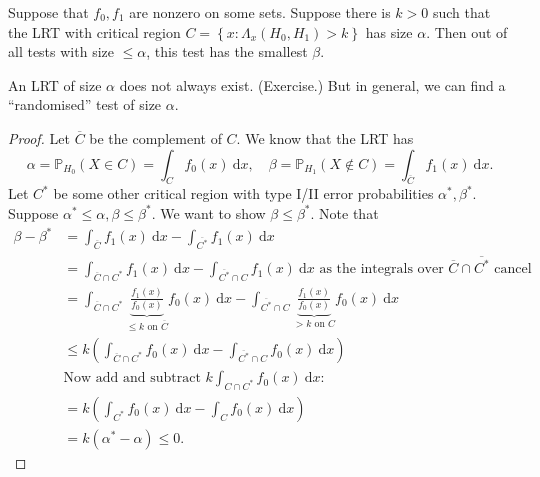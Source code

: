 \documentclass[egregdoesnotlikesansseriftitles,a4paper]{scrartcl}
\begin{document}
\begin{lemma}\label{neymanpearson}
      Suppose that $f_0 ,f_1 $ are nonzero on some sets. Suppose there is $k >0$ such that the LRT with critical region $C= \left\{x: \Lambda_{x} (H_0 ,H_1 ) >k\right\}$ has size $\alpha $. Then out of all tests with size $\leq  \alpha $, this test has the smallest $\beta $. 
      \begin{remark}
            An LRT of size $\alpha $ does not always exist. (Exercise.) But in general, we can find a ``randomised'' test of size $\alpha $.
      \end{remark}
      \begin{proof}
          Let $\overline{C}$ be the complement of $C$. We know that the LRT has \[
          \alpha =\mathbb{P}_{H_0 } (X \in C) =\int_{C}^{}f_{0} (x) \ \mathrm{d} x, \quad \beta  =\mathbb{P}_{H_1 } (X \notin C) =\int_{\overline{C}}^{}f_{1} (x) \ \mathrm{d} x
          .\] Let $C^{*}$ be some other critical region with type I/II error probabilities $\alpha ^* ,\beta ^* $. Suppose $\alpha ^* \leq \alpha , \beta  \leq \beta ^*$. We want to show $\beta  \leq \beta ^*$. Note that
          \begin{align*}
              \beta -\beta ^* &= \int_{\overline{C}}^{}f_{1}(x) \ \mathrm{d}x - \int_{\overline{C^*}}^{}f_{1}(x) \ \mathrm{d}x \\
              &=\int_{\overline{C}\cap C^*}^{}f_{1}(x) \ \mathrm{d}x - \int_{\overline{C^*}\cap C}^{}f_{1}(x) \ \mathrm{d}x \text{ as the integrals over } \overline{C}\cap \overline{C^*} \text{ cancel }\\
              &=\int_{\overline{C}\cap C^*}^{} \underbrace{\frac{f_{1}(x)}{f_0 (x)}}_{\leq k \text{ on } \overline{C}}  f_0 (x) \ \mathrm{d}x - \int_{\overline{C^*}\cap C}^{}\underbrace{\frac{f_{1}(x)}{f_0 (x)}}_{> k \text{ on } C} f_0 (x) \ \mathrm{d}x\\
              &\leq k \left(\int_{\overline{C}\cap C^*}^{}f_{0}(x) \ \mathrm{d}x - \int_{\overline{C^*}\cap C}^{}f_{0}(x) \ \mathrm{d}x\right)\\
              &\text{Now add and subtract }k \int_{C \cap C^*}^{}f_0 (x) \ \mathrm{d}x:\\
              &=k \left(\int_{C^*}^{}f_{0}(x) \ \mathrm{d}x - \int_{C}^{}f_{0}(x) \ \mathrm{d}x\right)\\
              &= k (\alpha^*-\alpha) \leq 0.
          \end{align*}
    \end{proof}
\end{lemma}
\end{document}
